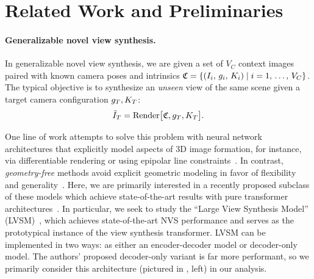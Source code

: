 \section{Related Work and Preliminaries}
\label{sec:background-scale}



%
\paragraph{Generalizable novel view synthesis.} 
%
In generalizable novel view synthesis, we are given a set of $V_C$ context images paired with known camera poses and intrinsics $\mathfrak{C} = \left\{(I_i, \, g_i, \, K_i) \mid i = 1, \, \ldots, \,V_C\right\}$. The typical objective is to synthesize an \emph{unseen} view of the same scene given a target camera configuration $g_{T}, K_{T}$:
%
\begin{equation}\label{eq:view_synthesis}
\tilde{I}_T = \mathrm{Render}\big[\mathfrak{C},  g_{T},  K_{T} \big].
\end{equation}

One line of work attempts to solve this problem with neural network architectures that explicitly model aspects of 3D image formation, for instance, via differentiable rendering or using epipolar line constraints~\cite{yu2020pixelnerf,sitzmann2019srns,charatan2024pixelsplat,szymanowicz2024splatter,suhail2022generalizable}. 
%
In contrast, \emph{geometry-free} methods avoid explicit geometric modeling in favor of flexibility and generality~\cite{eslami2018neural,sitzmann2021lfns,sajjadi2022scene,rombach2021geometry, sajjadi2023rust}. Here, we are primarily interested in a recently proposed subclass of these models which achieve state-of-the-art results with pure transformer architectures~\cite{jin2024lvsm, jiang2025rayzer, sajjadi2022scene, mitchel2025true}. In particular, we seek to study the ``Large View Synthesis Model'' (LVSM)~\cite{jin2024lvsm}, which achieves state-of-the-art NVS performance and serves as the prototypical instance of the view synthesis transformer. 
LVSM can be implemented in two ways: as either an encoder-decoder model or decoder-only model. The authors' proposed decoder-only variant is far more performant, so we primarily consider this architecture (pictured in , left) in our analysis.%


